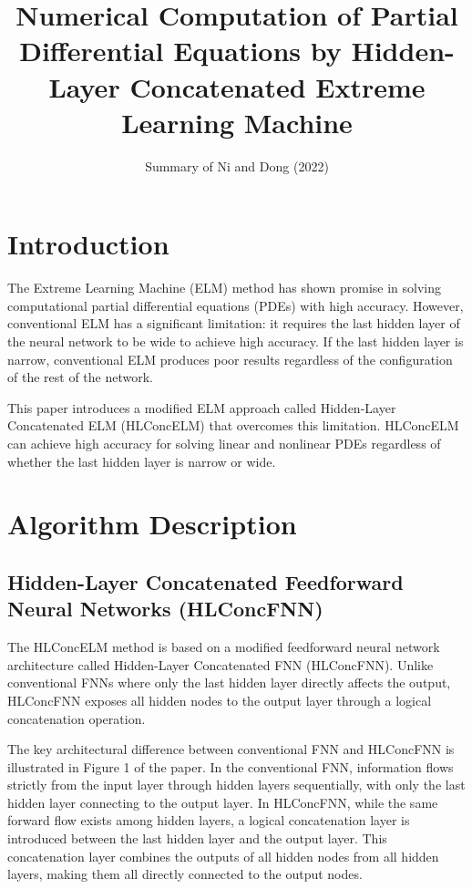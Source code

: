 \documentclass[11pt,a4paper]{article}
\title{Numerical Computation of Partial Differential Equations by Hidden-Layer Concatenated Extreme Learning Machine}
\author{Summary of Ni and Dong (2022)}
\date{}
\begin{document}
\maketitle

\section{Introduction}

The Extreme Learning Machine (ELM) method has shown promise in solving computational partial differential equations (PDEs) with high accuracy. However, conventional ELM has a significant limitation: it requires the last hidden layer of the neural network to be wide to achieve high accuracy. If the last hidden layer is narrow, conventional ELM produces poor results regardless of the configuration of the rest of the network.

This paper introduces a modified ELM approach called Hidden-Layer Concatenated ELM (HLConcELM) that overcomes this limitation. HLConcELM can achieve high accuracy for solving linear and nonlinear PDEs regardless of whether the last hidden layer is narrow or wide.

\section{Algorithm Description}

\subsection{Hidden-Layer Concatenated Feedforward Neural Networks (HLConcFNN)}

The HLConcELM method is based on a modified feedforward neural network architecture called Hidden-Layer Concatenated FNN (HLConcFNN). Unlike conventional FNNs where only the last hidden layer directly affects the output, HLConcFNN exposes all hidden nodes to the output layer through a logical concatenation operation.

The key architectural difference between conventional FNN and HLConcFNN is illustrated in Figure 1 of the paper. In the conventional FNN, information flows strictly from the input layer through hidden layers sequentially, with only the last hidden layer connecting to the output layer. In HLConcFNN, while the same forward flow exists among hidden layers, a logical concatenation layer is introduced between the last hidden layer and the output layer. This concatenation layer combines the outputs of all hidden nodes from all hidden layers, making them all directly connected to the output nodes.
\end{document}

